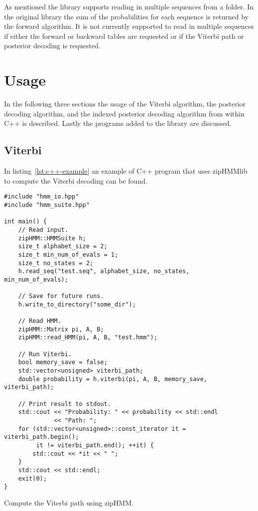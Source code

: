 As mentioned the library supports reading in multiple sequences from a folder. In the
original library the sum of the probabilities for each sequence is returned by
the forward algorithm. It is not currently supported to read in multiple
sequences if either the forward or backward tables are requested or if
the Viterbi path or posterior decoding is requested.

\section{Usage}

In the following three sections the usage of the Viterbi algorithm, the
posterior decoding algorithm, and the indexed posterior decoding algorithm from
within C++ is described. Lastly the programs added to the library are
discussed.

\subsection{Viterbi}

In listing~\ref{lst:c++-example} an example of C++ program that uses zipHMMlib
to compute the Viterbi decoding can be found.

\begin{listing}
\begin{verbatim}
#include "hmm_io.hpp"
#include "hmm_suite.hpp"

int main() {
    // Read input.
    zipHMM::HMMSuite h;
    size_t alphabet_size = 2;
    size_t min_num_of_evals = 1;
    size_t no_states = 2;
    h.read_seq("test.seq", alphabet_size, no_states, min_num_of_evals);

    // Save for future runs.
    h.write_to_directory("some_dir");

    // Read HMM.
    zipHMM::Matrix pi, A, B;
    zipHMM::read_HMM(pi, A, B, "test.hmm");

    // Run Viterbi.
    bool memory_save = false;
    std::vector<unsigned> viterbi_path;
    double probability = h.viterbi(pi, A, B, memory_save, viterbi_path);

    // Print result to stdout.
    std::cout << "Probability: " << probability << std::endl
              << "Path: ";
    for (std::vector<unsigned>::const_iterator it = viterbi_path.begin();
         it != viterbi_path.end(); ++it) {
        std::cout << *it << " ";
    }
    std::cout << std::endl;
    exit(0);
}
\end{verbatim}
\caption{Compute the Viterbi path using zipHMM.}
\label{lst:c++-example}
\end{listing}

